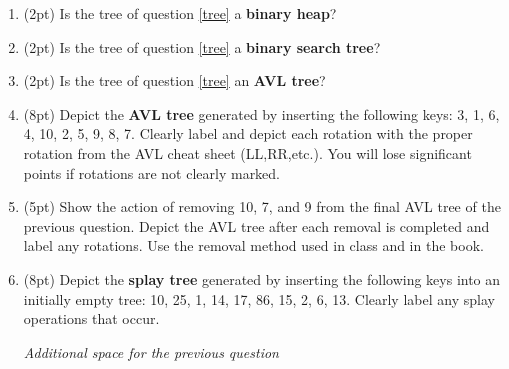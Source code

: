 \documentclass{article}
\newcommand*{\pts}[1]{\addtocounter{points}{#1}(#1pt)}
\begin{document}
\begin{spacing}{1.4}
\begin{enumerate}[leftmargin=*]
\begin{center}
{
}%
\end{center}

\newpage

\item \pts{2} Is the tree of question \ref{tree} a \textbf{binary heap}?

\vspace{1cm}

\item \pts{2} Is the tree of question \ref{tree} a \textbf{binary search tree}?

\vspace{1cm}

\item \pts{2} Is the tree of question \ref{tree} an \textbf{AVL tree}?

\vspace{1cm}


\item \pts{8} Depict the \textbf{AVL tree} generated by inserting the
  following keys: 3, 1, 6, 4, 10, 2, 5, 9, 8, 7. Clearly label and
  depict each rotation with the proper rotation from the AVL cheat
  sheet (LL,RR,etc.).  You will lose significant points if rotations
  are not clearly marked.

\newpage

\item \pts{5} Show the action of removing 10, 7, and 9
  from the final AVL tree of the previous question.  Depict the AVL
  tree after each removal is completed and label any rotations. Use
  the removal method used in class and in the book.

\vspace{6cm}


\item\label{splaytree} \pts{8} Depict the \textbf{splay tree} generated by
  inserting the following keys into an initially empty tree: 10, 25,
  1, 14, 17, 86, 15, 2, 6, 13. Clearly label any splay operations that
  occur.

\newpage

\begin{center}
\textit{Additional space for the previous question}
\end{center}


\end{enumerate}
\end{spacing}
\end{document}
